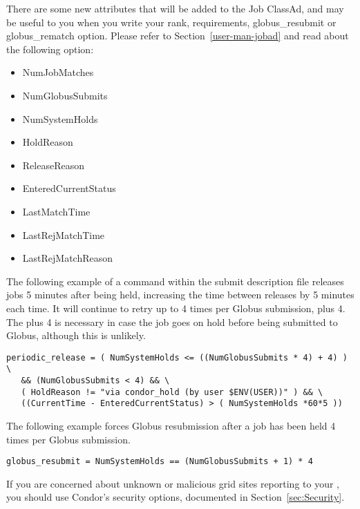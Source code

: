 There are some new attributes that will be added to the Job ClassAd,
and may be useful to you when you write your rank, requirements,
globus\_resubmit or globus\_rematch option. Please refer to
Section~\ref{user-man-jobad} and read about the following option:

\begin{itemize}
\item NumJobMatches
\item NumGlobusSubmits
\item NumSystemHolds
\item HoldReason
\item ReleaseReason
\item EnteredCurrentStatus
\item LastMatchTime
\item LastRejMatchTime
\item LastRejMatchReason
\end{itemize}

The following example of a command within the submit description file
releases jobs 5 minutes after being held,
increasing the time between releases by 5 minutes each time.
It will continue to retry up to 4 times per Globus
submission, plus 4.
The plus 4 is necessary in case
the job goes on hold before being submitted to Globus, although
this is unlikely.

\footnotesize
\begin{verbatim}
periodic_release = ( NumSystemHolds <= ((NumGlobusSubmits * 4) + 4) ) \
   && (NumGlobusSubmits < 4) && \
   ( HoldReason != "via condor_hold (by user $ENV(USER))" ) && \
   ((CurrentTime - EnteredCurrentStatus) > ( NumSystemHolds *60*5 ))
\end{verbatim}
\normalsize

The following example forces Globus resubmission after a job has
been held 4 times per Globus submission.

\footnotesize
\begin{verbatim}
globus_resubmit = NumSystemHolds == (NumGlobusSubmits + 1) * 4
\end{verbatim}
\normalsize

If you are concerned about unknown or malicious grid sites reporting
to your , you should use Condor's security options,
documented in Section~\ref{sec:Security}.
